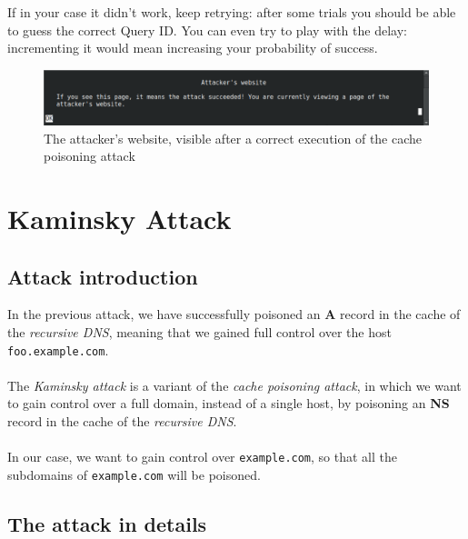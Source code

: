 \documentclass[11pt,a4paper]{article}
\begin{document}
\noindent
If in your case it didn't work, keep retrying: after some trials you should be able to guess the correct Query ID. You can even try to play with the delay: incrementing it would mean increasing your probability of success.

\begin{figure}[h!]
    \centering
    \includegraphics[width=\textwidth]{attacker-website.png}
    \caption{The attacker's website, visible after a correct execution of the cache poisoning attack}
    \label{fig:attacker-website}
\end{figure}

\newpage
\section{Kaminsky Attack}

\subsection{Attack introduction}

In the previous attack, we have successfully poisoned an \textbf{A} record in the
cache of the \emph{recursive DNS}, meaning that we gained full control over the
host \texttt{foo.example.com}.
\\
\\
\noindent
The \emph{Kaminsky attack} is a variant of the \emph{cache poisoning attack}, in
which we want to gain control over a full domain, instead of a single host, by
poisoning an \textbf{NS} record in the cache of the \emph{recursive DNS}.
\\
\\
\noindent
In our case, we want to gain control over \texttt{example.com}, so that all the
subdomains of \texttt{example.com} will be poisoned.

\subsection{The attack in details}
\end{document}
